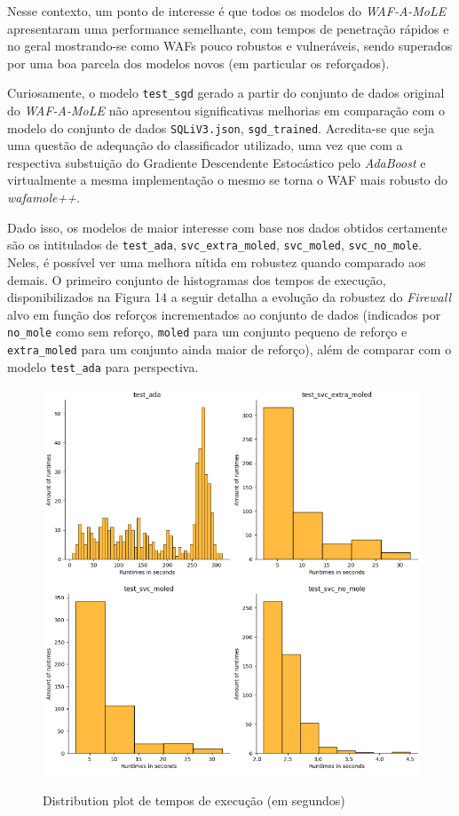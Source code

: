 Nesse contexto, um ponto  de interesse é que todos os modelos do \textit{WAF-A-MoLE} apresentaram uma performance semelhante, com tempos de penetração rápidos e no geral mostrando-se como WAFs pouco robustos e vulneráveis, sendo superados por uma boa parcela dos modelos novos (em particular os reforçados).

Curiosamente, o modelo \verb+test_sgd+ gerado a partir do conjunto de dados original do \textit{WAF-A-MoLE} não apresentou significativas melhorias em comparação com o modelo do conjunto de dados \verb+SQLiV3.json+, \verb+sgd_trained+. Acredita-se que seja uma questão de adequação do classificador utilizado, uma vez que com a respectiva substuição do Gradiente Descendente Estocástico pelo \textit{AdaBoost} e virtualmente a mesma implementação o mesmo se torna o WAF mais robusto do \textit{wafamole++}.

Dado isso, os modelos de maior interesse com base nos dados obtidos certamente são os intitulados de \verb+test_ada+, \verb+svc_extra_moled+, \verb+svc_moled+, \verb+svc_no_mole+. Neles, é possível ver uma melhora nítida em robustez quando comparado aos demais. O primeiro conjunto de histogramas dos tempos de execução, disponibilizados na Figura 14 a seguir detalha a evolução da robustez do \textit{Firewall} alvo em função dos reforços incrementados ao conjunto de dados (indicados por \verb+no_mole+ como sem reforço, \verb+moled+ para um conjunto pequeno de reforço e \verb+extra_moled+ para um conjunto ainda maior de reforço), além de comparar com o modelo \verb+test_ada+ para perspectiva. 

\begin{figure}[ht]
    \centering
    \caption{Distribution plot de tempos de execução (em segundos)}
    \includegraphics[width=18cm]{figuras/graficos/runtimes_amount_set1.png} 
    \label{fig:mole-evolution} 
\end{figure}

